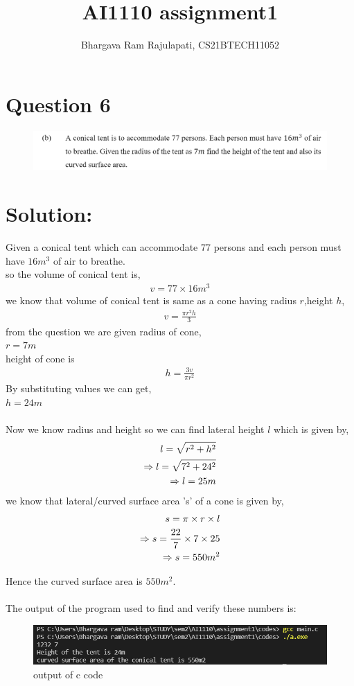 \documentclass[12pt]{article}
\title{AI1110 assignment1}
\author{Bhargava Ram Rajulapati, CS21BTECH11052}
\begin{document}
  \maketitle
  \section*{Question 6}
  \begin{figure}[h]
  \includegraphics[width=\textwidth]{question.png}
  \end{figure}
  \section*{Solution:}
  Given a conical tent which can accommodate 77 persons and each         
   person must have $16m^3$ of air to breathe.\\
  so the volume of conical tent is,
  \begin{align*}
    v = 77 \times 16 m^3 
  \end{align*}
  we know that volume of conical tent is same as a cone having
  radius $r$,height $h$,
  \begin{align*}
     v = \frac{\pi r^2 h}{3} 
  \end{align*}
  from the question we are given radius of cone, \\
  $ r = 7 m $\\ 
  height of cone is
  \begin{align*}
   h = \frac{3 v}{\pi r^2} 
  \end{align*}
  By substituting values we can get, \\
  $ h = 24 m $ \\\\
  Now we know radius and height so we can find lateral height $l$
  which is given by,
  \begin{align*}
    \hspace*{12pt} l = \sqrt{r^2 + h^2} \\
    \Rightarrow l = \sqrt{7^2 + 24^2} \\
    \Rightarrow l = 25 m
  \end{align*}
  we know that lateral/curved surface area 's' of a cone is given
  by,
  \begin{align*}
    \hspace*{12pt} s = \pi \times r \times l \\
    \Rightarrow  s = \frac{22}{7} \times 7 \times 25  \\
    \Rightarrow  s = 550 m^2 
  \end{align*}
   
  Hence the curved surface area is $ 550 m^2 $. \\\\
  The output of the program used to find and verify these numbers
  is: \\
  \begin{figure}[h]
  \includegraphics[width=\textwidth]{output.png}
  \caption{output of c code}
  \end{figure}   
\end{document}

